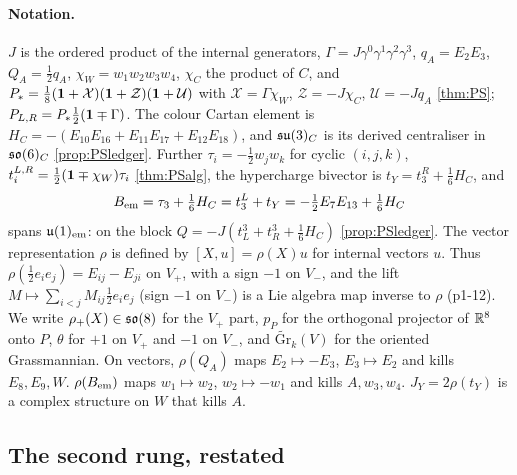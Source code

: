 \paragraph{Notation.} $J$ is the ordered product of the internal generators, $\Gamma=J\gamma^0\gamma^1\gamma^2\gamma^3$, $q_A=E_2E_3$, $Q_A=\tfrac12q_A$, $\chi_W=w_1w_2w_3w_4$,
$\chi_C$ the product of $C$, and $P_*=\tfrac18(\mathbf 1+\mathcal X)(\mathbf 1+\mathcal Z)(\mathbf 1+\mathcal U)$ with $\mathcal X=\Gamma\chi_W$, $\mathcal Z=-J\chi_C$, $\mathcal U=-Jq_A$ \cref{thm:PS}; $P_{L,R}=P_*\tfrac12(\mathbf 1\mp\Gamma)$.
The colour Cartan element is $H_C=-(E_{10}E_{16}+E_{11}E_{17}+E_{12}E_{18})$, and $\mathfrak{su}(3)_C$ is its derived centraliser in $\mathfrak{so}(6)_C$ \cref{prop:PSledger}. Further
$\tau_i=-\tfrac12w_jw_k$ for cyclic $(i,j,k)$, $t^{L,R}_i=\tfrac12(\mathbf 1\mp\chi_W)\tau_i$ \cref{thm:PSalg}, the hypercharge bivector is $t_Y=t^R_3+\tfrac16H_C$, and
\[
B_{\rm em}=\tau_3+\tfrac16H_C=t^L_3+t_Y=-\tfrac12E_7E_{13}+\tfrac16H_C
\]
spans $\mathfrak{u}(1)_{\rm em}$: on the block $Q=-J(t^3_L+t^3_R+\tfrac16H_C)$ \cref{prop:PSledger}. The vector representation $\rho$ is defined by $[X,u]=\rho(X)u$ for internal
vectors $u$. Thus $\rho(\tfrac12e_ie_j)=E_{ij}-E_{ji}$ on $V_+$, with a sign $-1$ on $V_-$, and the lift $M\mapsto\sum_{i<j}M_{ij}\tfrac12e_ie_j$ (sign $-1$ on $V_-$) is a Lie
algebra map inverse to $\rho$ (p1-12). We write $\rho_+(X)\in\mathfrak{so}(8)$ for the $V_+$ part, $p_P$ for the orthogonal projector of $\mathbb{R}^8$ onto $P$, $\theta$ for $+1$ on $V_+$ and
$-1$ on $V_-$, and $\widetilde{\mathrm{Gr}}_k(V)$ for the oriented Grassmannian. On vectors, $\rho(Q_A)$ maps $E_2\mapsto-E_3$, $E_3\mapsto E_2$ and kills $E_8,E_9,W$. $\rho(B_{\rm em})$
maps $w_1\mapsto w_2$, $w_2\mapsto-w_1$ and kills $A,w_3,w_4$. $J_Y=2\rho(t_Y)$ is a complex structure on $W$ that kills $A$.

\subsection{The second rung, restated}
\label{p1:sec:n2}

